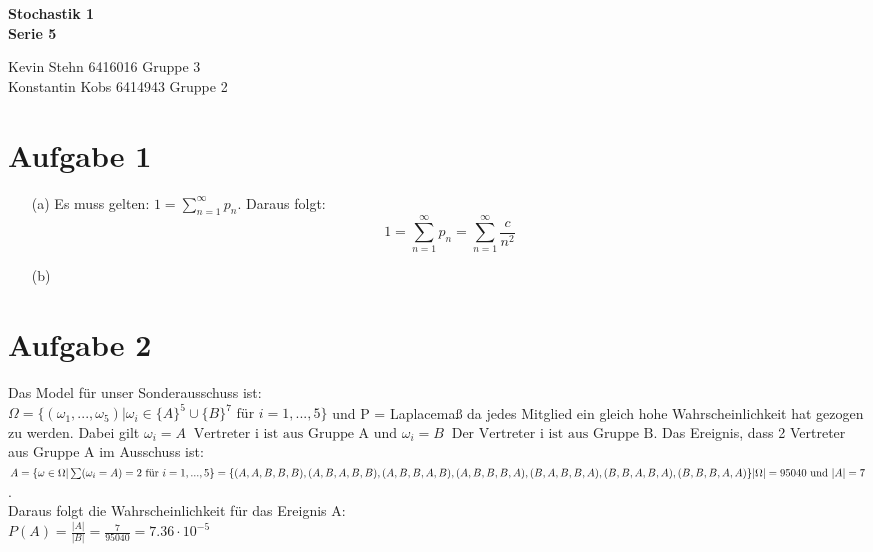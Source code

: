 \documentclass[10pt,a4paper]{article}
\newcommand{\ent}{\mathop{\widehat{=}}}
\begin{document}
\begin{center}
\textbf{Stochastik 1 \\ Serie 5 \\}
\end{center}

\begin{flushright}
Kevin Stehn 6416016 Gruppe 3 \\
Konstantin Kobs 6414943 Gruppe 2
\end{flushright}

\section*{Aufgabe 1}
\begin{itemize}
\item[(a)]Es muss gelten: $1 = \sum\nolimits_{n=1}^\infty p_n$. Daraus folgt:\\
\[ 1 = \sum_{n=1}^\infty p_n = \sum_{n=1}^\infty \frac{c}{n^2} \]
\item[(b)]
\end{itemize}

\section*{Aufgabe 2}
Das Model für unser Sonderausschuss ist:\\
$\Omega = \{ (\omega_1,...,\omega_5) | \omega_i \in \{A\}^5 \cup \{B\}^7 \text{ f\"ur } i= 1,...,5 \}$ und P = Laplacemaß da jedes Mitglied ein gleich hohe Wahrscheinlichkeit hat gezogen zu werden. Dabei gilt $\omega_i = A \ent \text{Vertreter i ist aus Gruppe A und } \omega_i = B \ent \text{Der Vertreter i ist aus Gruppe B}$.
Das Ereignis, dass 2 Vertreter aus Gruppe A im Ausschuss ist:\\
$A = \{\omega \in \Omega | \sum(\omega_i = A) = 2 \text{ f\"ur } i = 1,...,5\} =\newline \{(A,A,B,B,B),(A,B,A,B,B),(A,B,B,A,B),(A,B,B,B,A),\newline(B,A,B,B,A),(B,B,A,B,A),(B,B,B,A,A) \} \newline
|\Omega| = 95040 \text{ und  } |A| = 7$. \\
Daraus folgt die Wahrscheinlichkeit für das Ereignis A:\\
$P(A) = \frac{|A|}{|B|} = \frac{7}{95040} = 7.36 \cdot 10^{-5}$
\end{document}
